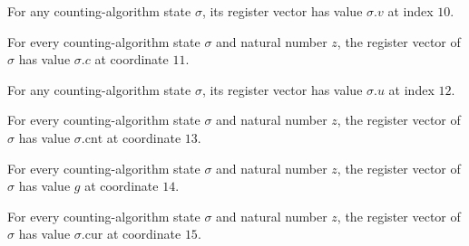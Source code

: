 \begin{lemma}
\label{Complexity.LogProg.ISCount.St.toV_v}
\leanok
{}
For any counting-algorithm state $\sigma$, its register vector has value $\sigma.v$ at
index $10$.
\end{lemma}

\begin{lemma}
\label{Complexity.LogProg.ISCount.St.toV_c}
\leanok
{}
For every counting-algorithm state $\sigma$ and natural number $z$, the register vector
of $\sigma$ has value $\sigma.c$ at coordinate $11$.
\end{lemma}

\begin{lemma}
\label{Complexity.LogProg.ISCount.St.toV_u}
\leanok
{}
For any counting-algorithm state $\sigma$, its register vector has value $\sigma.u$ at
index $12$.
\end{lemma}

\begin{lemma}
\label{Complexity.LogProg.ISCount.St.toV_cnt}
\leanok
{}
For every counting-algorithm state $\sigma$ and natural number $z$, the register vector
of $\sigma$ has value $\sigma.\mathrm{cnt}$ at coordinate $13$.
\end{lemma}

\begin{lemma}
\label{Complexity.LogProg.ISCount.St.toV_g}
\leanok
{}
For every counting-algorithm state $\sigma$ and natural number $z$, the register vector
of $\sigma$ has value $g$ at coordinate $14$.
\end{lemma}

\begin{lemma}
\label{Complexity.LogProg.ISCount.St.toV_cur}
\leanok
{}
For every counting-algorithm state $\sigma$ and natural number $z$, the register vector
of $\sigma$ has value $\sigma.\mathrm{cur}$ at coordinate $15$.
\end{lemma}

